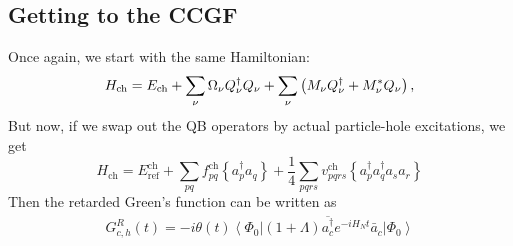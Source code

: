 \subsection{Getting to the CCGF}
Once again, we start with the same Hamiltonian:
\begin{equation}
H_{\rm ch}
=
E_{\rm ch}
+
\sum_\nu
\Omega_\nu Q_\nu^\dagger Q_\nu
+
\sum_\nu
\left(
M_\nu Q_\nu^\dagger
+
M_\nu^* Q_\nu
\right),
\end{equation}
But now, if we swap out the QB operators by actual particle-hole excitations, we get 
\begin{equation}
H_{\mathrm{ch}}=E_{\mathrm{ref}}^{\mathrm{ch}}+\sum_{p q} f_{p q}^{\mathrm{ch}}\left\{a_p^{\dagger} a_q\right\}+\frac{1}{4} \sum_{p q r s} v_{p q r s}^{\mathrm{ch}}\left\{a_p^{\dagger} a_q^{\dagger} a_s a_r\right\}
\end{equation}
Then the retarded Green's function can be written as 
\begin{align}
G_{c, h}^R(t)=-i \theta(t)\left\langle\Phi_0\right|(1+\Lambda) \overline{a_c^{\dagger}} e^{-i H_N t} \bar{a}_c\left|\Phi_0\right\rangle
\end{align}
